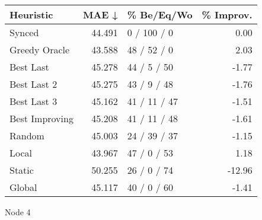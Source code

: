 \begin{tabular}{lrlr}
\toprule
\textbf{Heuristic} & \textbf{MAE ↓} & \textbf{\% Be/Eq/Wo} & \textbf{\% Improv.} \\
\midrule
            Synced &         44.491 &          0 / 100 / 0 &                0.00 \\
     Greedy Oracle &         43.588 &          48 / 52 / 0 &                2.03 \\
         Best Last &         45.278 &          44 / 5 / 50 &               -1.77 \\
       Best Last 2 &         45.275 &          43 / 9 / 48 &               -1.76 \\
       Best Last 3 &         45.162 &         41 / 11 / 47 &               -1.51 \\
    Best Improving &         45.208 &         41 / 11 / 48 &               -1.61 \\
            Random &         45.003 &         24 / 39 / 37 &               -1.15 \\
             Local &         43.967 &          47 / 0 / 53 &                1.18 \\
            Static &         50.255 &          26 / 0 / 74 &              -12.96 \\
            Global &         45.117 &          40 / 0 / 60 &               -1.41 \\
\bottomrule
\end{tabular}
\caption{Node 4}
\label{tab:non_lr05_le2_bs4_4}
